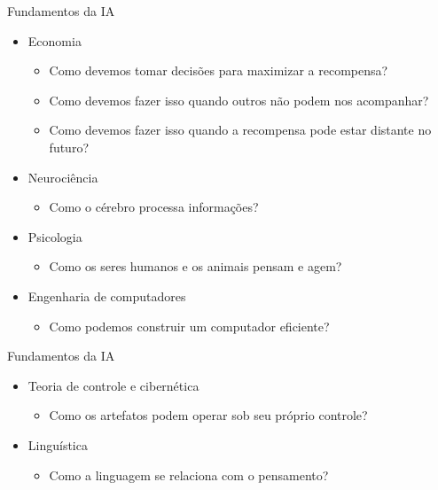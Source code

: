 \documentclass{libs/ufc_format}
\begin{document}
\begin{frame}{Fundamentos da IA}
    \begin{itemize}
        \justifying
        \item Economia
            \begin{itemize}
                \justifying
                \item<1> Como devemos tomar decisões para maximizar a recompensa?
                \item<1> Como devemos fazer isso quando outros não podem nos acompanhar?
                \item<1> Como devemos fazer isso quando a recompensa pode estar distante no futuro?
            \end{itemize}
        \item<2-> Neurociência
            \begin{itemize}
                \justifying
                \item<2> Como o cérebro processa informações?
            \end{itemize}
        \item<3-> Psicologia
            \begin{itemize}
                \justifying
                \item<3> Como os seres humanos e os animais pensam e agem?
            \end{itemize}
        \item<4-> Engenharia de computadores
            \begin{itemize}
                \justifying
                \item<4> Como podemos construir um computador eficiente?
            \end{itemize}
    \end{itemize}
\end{frame}

\begin{frame}{Fundamentos da IA}
    \begin{itemize}
        \justifying
        \item Teoria de controle e cibernética
            \begin{itemize}
                \justifying
                \item<1> Como os artefatos podem operar sob seu próprio controle?
            \end{itemize}
        \item<2-> Linguística
            \begin{itemize}
                \justifying
                \item<2> Como a linguagem se relaciona com o pensamento?
            \end{itemize}
    \end{itemize}
\end{frame}
\end{document}
